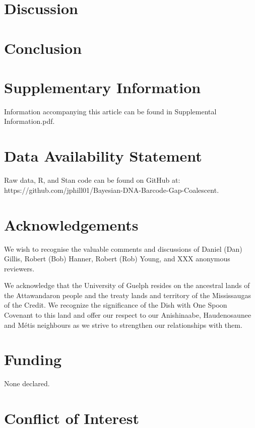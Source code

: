 \documentclass[12pt]{article}
\begin{document}
\section{Discussion}

\section{Conclusion}


\newpage

\section*{Supplementary Information}

Information accompanying this article can be found in Supplemental Information.pdf.

\section*{Data Availability Statement}

Raw data, R, and Stan code can be found on GitHub at: \\ https://github.com/jphill01/Bayesian-DNA-Barcode-Gap-Coalescent.

\section*{Acknowledgements}

We wish to recognise the valuable comments and discussions of Daniel (Dan) Gillis, Robert (Bob) Hanner, Robert (Rob) Young, and XXX anonymous reviewers.

We acknowledge that the University of Guelph resides on the ancestral lands of the Attawandaron people and the treaty lands and territory of the Mississaugas of the Credit. We recognize the significance of the Dish with One Spoon Covenant to this land and offer our respect to our Anishinaabe, Haudenosaunee and M{\'e}tis neighbours as we strive to strengthen our relationships with them.

\section*{Funding}

None declared.

\section*{Conflict of Interest}
\end{document}
